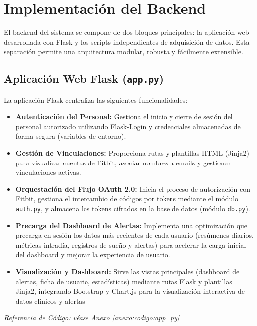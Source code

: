 \section{Implementación del Backend}
\label{sec:impl_backend}

El backend del sistema se compone de dos bloques principales: la aplicación web desarrollada con Flask y los scripts independientes de adquisición de datos. Esta separación permite una arquitectura modular, robusta y fácilmente extensible.

\subsection{Aplicación Web Flask (\texttt{app.py})}
La aplicación Flask centraliza las siguientes funcionalidades:
\begin{itemize}
    \item \textbf{Autenticación del Personal:} Gestiona el inicio y cierre de sesión del personal autorizado utilizando Flask-Login y credenciales almacenadas de forma segura (variables de entorno).
    \item \textbf{Gestión de Vinculaciones:} Proporciona rutas y plantillas HTML (Jinja2) para visualizar cuentas de Fitbit, asociar nombres a emails y gestionar vinculaciones activas.
    \item \textbf{Orquestación del Flujo OAuth 2.0:} Inicia el proceso de autorización con Fitbit, gestiona el intercambio de códigos por tokens mediante el módulo \texttt{auth.py}, y almacena los tokens cifrados en la base de datos (módulo \texttt{db.py}).
    \item \textbf{Precarga del Dashboard de Alertas:} Implementa una optimización que precarga en sesión los datos más recientes de cada usuario (resúmenes diarios, métricas intradía, registros de sueño y alertas) para acelerar la carga inicial del dashboard y mejorar la experiencia de usuario.
    \item \textbf{Visualización y Dashboard:} Sirve las vistas principales (dashboard de alertas, ficha de usuario, estadísticas) mediante rutas Flask y plantillas Jinja2, integrando Bootstrap y Chart.js para la visualización interactiva de datos clínicos y alertas.
\end{itemize}
\noindent\textit{Referencia de Código: véase Anexo \ref{anexo:codigo:app_py}}


